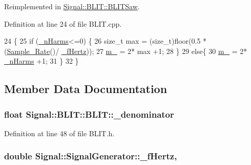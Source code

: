 Reimplemented in \hyperlink{classSignal_1_1BLIT_1_1BLITSaw_a9c8ad70fca571cc707eaa99649d74afc}{Signal\+::\+B\+L\+I\+T\+::\+B\+L\+I\+T\+Saw}.



Definition at line 24 of file B\+L\+I\+T.\+cpp.


\begin{DoxyCode}
24                                 \{
25     \textcolor{keywordflow}{if} (\hyperlink{classSignal_1_1BLIT_1_1BLIT_a0bfbf4e7515a42fab7df748b8497f648}{\_nHarms}<=0) \{
26         \textcolor{keywordtype}{size\_t} max = (size\_t)floor(0.5 * (\hyperlink{namespaceSignal_ae7b1f222afc010e0f33f306f978fcde9}{Sample\_Rate}()/ \hyperlink{classSignal_1_1SignalGenerator_a85a4702347352bab1c71e0a8df8437d6}{\_fHertz}));
27         \hyperlink{classSignal_1_1BLIT_1_1BLIT_a314aae37a0a53fa3f79a4466b9558fa5}{m\_} = 2* max +1;
28     \}
29     \textcolor{keywordflow}{else}\{
30         \hyperlink{classSignal_1_1BLIT_1_1BLIT_a314aae37a0a53fa3f79a4466b9558fa5}{m\_} = 2* \hyperlink{classSignal_1_1BLIT_1_1BLIT_a0bfbf4e7515a42fab7df748b8497f648}{\_nHarms} +1;
31     \}
32 \}\end{DoxyCode}


\subsection{Member Data Documentation}
\hypertarget{classSignal_1_1BLIT_1_1BLIT_abef50d7ff7da92f5f0a8482287b47ae5}{
\subsubsection[{\+\_\+denominator}]{\setlength{\rightskip}{0pt plus 5cm}float Signal\+::\+B\+L\+I\+T\+::\+B\+L\+I\+T\+::\+\_\+denominator\hspace{0.3cm}{\ttfamily [protected]}}}\label{classSignal_1_1BLIT_1_1BLIT_abef50d7ff7da92f5f0a8482287b47ae5}


Definition at line 48 of file B\+L\+I\+T.\+h.

\hypertarget{classSignal_1_1SignalGenerator_a85a4702347352bab1c71e0a8df8437d6}{
\subsubsection[{\+\_\+f\+Hertz}]{\setlength{\rightskip}{0pt plus 5cm}double Signal\+::\+Signal\+Generator\+::\+\_\+f\+Hertz\hspace{0.3cm}{\ttfamily [protected]}, {\ttfamily [inherited]}}}\label{classSignal_1_1SignalGenerator_a85a4702347352bab1c71e0a8df8437d6}



